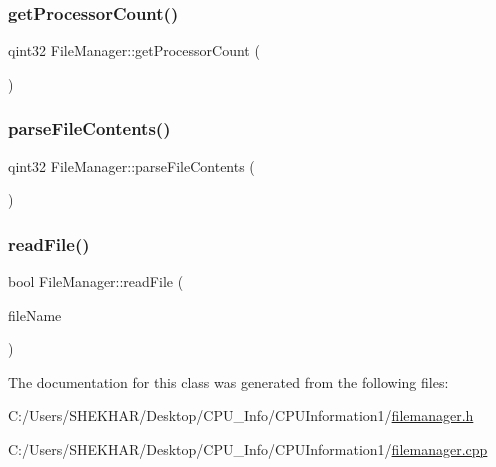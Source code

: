 \subsubsection{\texorpdfstring{get\+Processor\+Count()}{getProcessorCount()}}
{\footnotesize\ttfamily qint32 File\+Manager\+::get\+Processor\+Count (\begin{DoxyParamCaption}{ }\end{DoxyParamCaption})}

\mbox{\label{class_file_manager_a7bbda9c89953f666440a1550adf4bb2f}} 
\subsubsection{\texorpdfstring{parse\+File\+Contents()}{parseFileContents()}}
{\footnotesize\ttfamily qint32 File\+Manager\+::parse\+File\+Contents (\begin{DoxyParamCaption}{ }\end{DoxyParamCaption})}

\mbox{\label{class_file_manager_ac2f59a9eab9545d803729fd73438ff13}} 
\subsubsection{\texorpdfstring{read\+File()}{readFile()}}
{\footnotesize\ttfamily bool File\+Manager\+::read\+File (\begin{DoxyParamCaption}\item[{const Q\+String \&}]{file\+Name }\end{DoxyParamCaption})}



The documentation for this class was generated from the following files\+:\begin{DoxyCompactItemize}
\item 
C\+:/\+Users/\+S\+H\+E\+K\+H\+A\+R/\+Desktop/\+C\+P\+U\+\_\+\+Info/\+C\+P\+U\+Information1/\hyperlink{filemanager_8h}{filemanager.\+h}\item 
C\+:/\+Users/\+S\+H\+E\+K\+H\+A\+R/\+Desktop/\+C\+P\+U\+\_\+\+Info/\+C\+P\+U\+Information1/\hyperlink{filemanager_8cpp}{filemanager.\+cpp}\end{DoxyCompactItemize}
